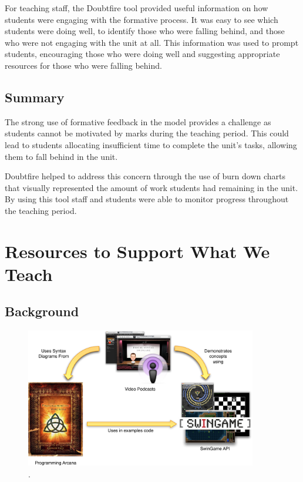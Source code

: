 For teaching staff, the Doubtfire tool provided useful information on how students were engaging with the formative process. It was easy to see which students were doing well, to identify those who were falling behind, and those who were not engaging with the unit at all. This information was used to prompt students, encouraging those who were doing well and suggesting appropriate resources for those who were falling behind.

\subsection{Summary} %
\label{sub:doubtfire_summary}

The strong use of formative feedback in the model provides a challenge as students cannot be motivated by marks during the teaching period. This could lead to students allocating insufficient time to complete the unit's tasks, allowing them to fall behind in the unit.

Doubtfire helped to address this concern through the use of burn down charts that visually represented the amount of work students had remaining in the unit. By using this tool staff and students were able to monitor progress throughout the teaching period.



\section{Resources to Support What We Teach} %
\label{sec:arcana}

\subsection{Background} %
\label{sub:arcana_background}

\begin{figure}[thb]
  \centering
  \includegraphics[width=0.9\textwidth]{SupportWhatWeTeach}
  \caption{.}
  \label{fig:support}
\end{figure}

